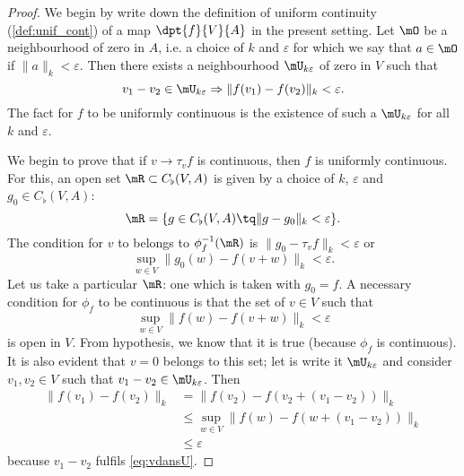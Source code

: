 \begin{proof}
	We begin by write down the definition of uniform continuity (\ref{def:unif_cont}) of a map $\dpt{f}{V}{A}$ in the present setting. Let $\mO$ be a neighbourhood of zero in $A$, i.e. a choice of $k$ and $\varepsilon$ for which we say that $a\in\mO$ if $\| a \|_k<\varepsilon$. Then there exists a neighbourhood $\mU_{k\varepsilon}$ of zero in $V$ such that
	\begin{equation}
		v_1-v_2\in\mU_{k\varepsilon}\Rightarrow \| f(v_1)-f(v_2) \|_k<\varepsilon.
	\end{equation}
	The fact for $f$ to be uniformly continuous is the existence of such a $\mU_{k\varepsilon}$ for all $k$ and $\varepsilon$.

	We begin to prove that if $v\to\tau_vf$ is continuous, then $f$ is uniformly continuous.  For this, an open set $\mR\subset C_{\flat}(V,A)$ is given by a choice of $k$, $\varepsilon$ and $g_0\in C_{\flat}(V,A)$:
	\begin{equation}
		\mR=\{ g\in C_{\flat}(V,A)\tq \| g-g_0 \|_k< \varepsilon  \}.
	\end{equation}
	The condition for $v$ to belongs to $\phi_f^{-1}(\mR)$ is $\| g_0-\tau_vf \|_k<\varepsilon$ or
	\begin{equation}
		\sup_{w\in V}\| g_0(w)-f(v+w) \|_k<\varepsilon.
	\end{equation}
	Let us take a particular $\mR$: one which is taken with $g_0=f$. A necessary condition for $\phi_f$ to be continuous is that the set of $v\in V$ such that
	\begin{equation} \label{eq:vdansU}
		\sup_{w\in V}\| f(w)-f(v+w) \|_k<\varepsilon
	\end{equation}
	is open in $V$. From hypothesis, we know that it is true (because $\phi_f$ is continuous). It is also evident that $v=0$ belongs to this set; let is write it $\mU_{k\varepsilon}$ and consider $v_1,v_2\in V$ such that $v_1-v_2\in\mU_{k\varepsilon}$. Then
	\begin{equation}
		\begin{split}
			\| f(v_1)-f(v_2) \|_k&=\| f(v_2)-f(v_2+(v_1-v_2)) \|_k\\
			&\leq \sup_{w\in V}\| f(w)-f(w+(v_1-v_2)) \|_k\\
			&\leq \varepsilon
		\end{split}
	\end{equation}
	because $v_1-v_2$ fulfils \eqref{eq:vdansU}.


\end{proof}
